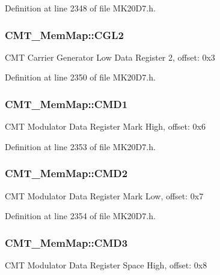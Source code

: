 Definition at line 2348 of file M\+K20\+D7.\+h.

\subsubsection[{\texorpdfstring{C\+G\+L2}{CGL2}}]{ C\+M\+T\+\_\+\+Mem\+Map\+::\+C\+G\+L2}\hypertarget{struct_c_m_t___mem_map_ae37d0c89ef9e59676774e958d5e96153}{}\label{struct_c_m_t___mem_map_ae37d0c89ef9e59676774e958d5e96153}
C\+MT Carrier Generator Low Data Register 2, offset\+: 0x3 

Definition at line 2350 of file M\+K20\+D7.\+h.

\subsubsection[{\texorpdfstring{C\+M\+D1}{CMD1}}]{ C\+M\+T\+\_\+\+Mem\+Map\+::\+C\+M\+D1}\hypertarget{struct_c_m_t___mem_map_a6771f22304d3dc09e2c1df31985a1f2a}{}\label{struct_c_m_t___mem_map_a6771f22304d3dc09e2c1df31985a1f2a}
C\+MT Modulator Data Register Mark High, offset\+: 0x6 

Definition at line 2353 of file M\+K20\+D7.\+h.

\subsubsection[{\texorpdfstring{C\+M\+D2}{CMD2}}]{ C\+M\+T\+\_\+\+Mem\+Map\+::\+C\+M\+D2}\hypertarget{struct_c_m_t___mem_map_a40660a71cbcc2c0a2b0690bf2f8017d3}{}\label{struct_c_m_t___mem_map_a40660a71cbcc2c0a2b0690bf2f8017d3}
C\+MT Modulator Data Register Mark Low, offset\+: 0x7 

Definition at line 2354 of file M\+K20\+D7.\+h.

\subsubsection[{\texorpdfstring{C\+M\+D3}{CMD3}}]{ C\+M\+T\+\_\+\+Mem\+Map\+::\+C\+M\+D3}\hypertarget{struct_c_m_t___mem_map_a7918a8c8dfb707fc6ac973f26495d20d}{}\label{struct_c_m_t___mem_map_a7918a8c8dfb707fc6ac973f26495d20d}
C\+MT Modulator Data Register Space High, offset\+: 0x8 


